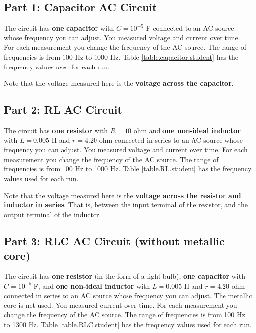 \subsection{Part 1: Capacitor AC Circuit}
The circuit has \textbf{one capacitor} with $C = 10^{-5}$ F connected to an AC source whose frequency you can adjust. You measured voltage and current over time. For each measurement you change the frequency of the AC source. The range of frequencies is from 100 Hz to 1000 Hz. Table \ref{table.capacitor.student} has the frequency values used for each run.

Note that the voltage measured here is the \textbf{voltage across the capacitor}.
\subsection{Part 2: RL AC Circuit}
The circuit has \textbf{one resistor} with $R = 10 $ ohm and \textbf{one non-ideal inductor} with $L = 0.005$ H and $r = 4.20$ ohm connected in series to an AC source whose frequency you can adjust. You measured voltage and current over time. For each measurement you change the frequency of the AC source. The range of frequencies is from 100 Hz to 1000 Hz. Table \ref{table.RL.student} has the frequency values used for each run.

Note that the voltage measured here is the \textbf{voltage across the resistor and inductor in series}. That is, between the input terminal of the resistor, and the output terminal of the inductor.
\subsection{Part 3: RLC AC Circuit (without metallic core)}
The circuit has \textbf{one resistor} (in the form of a light bulb), \textbf{one capacitor} with $C = 10^{-5}$ F, and \textbf{one non-ideal inductor} with $L = 0.005$ H and $r = 4.20$ ohm connected in series to an AC source whose frequency you can adjust. The metallic core is not used. You measured current over time. For each measurement you change the frequency of the AC source. The range of frequencies is from 100 Hz to 1300 Hz. Table \ref{table.RLC.student} has the frequency values used for each run.
